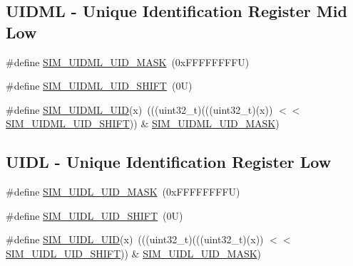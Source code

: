 \subsection*{U\+I\+D\+ML -\/ Unique Identification Register Mid Low}
\begin{DoxyCompactItemize}
\item 
\#define \mbox{\hyperlink{group___s_i_m___register___masks_ga87fba538d2482490ddfdb1ef8a44ec66}{S\+I\+M\+\_\+\+U\+I\+D\+M\+L\+\_\+\+U\+I\+D\+\_\+\+M\+A\+SK}}~(0x\+F\+F\+F\+F\+F\+F\+F\+F\+U)
\item 
\#define \mbox{\hyperlink{group___s_i_m___register___masks_gacedaca5a049852ee395767e70f806c14}{S\+I\+M\+\_\+\+U\+I\+D\+M\+L\+\_\+\+U\+I\+D\+\_\+\+S\+H\+I\+FT}}~(0\+U)
\item 
\#define \mbox{\hyperlink{group___s_i_m___register___masks_ga0eb63e00b9ee42283435043b437b8d29}{S\+I\+M\+\_\+\+U\+I\+D\+M\+L\+\_\+\+U\+ID}}(x)~(((uint32\+\_\+t)(((uint32\+\_\+t)(x)) $<$$<$ \mbox{\hyperlink{group___s_i_m___register___masks_gacedaca5a049852ee395767e70f806c14}{S\+I\+M\+\_\+\+U\+I\+D\+M\+L\+\_\+\+U\+I\+D\+\_\+\+S\+H\+I\+FT}})) \& \mbox{\hyperlink{group___s_i_m___register___masks_ga87fba538d2482490ddfdb1ef8a44ec66}{S\+I\+M\+\_\+\+U\+I\+D\+M\+L\+\_\+\+U\+I\+D\+\_\+\+M\+A\+SK}})
\end{DoxyCompactItemize}
\subsection*{U\+I\+DL -\/ Unique Identification Register Low}
\begin{DoxyCompactItemize}
\item 
\#define \mbox{\hyperlink{group___s_i_m___register___masks_ga412340eabbcd0f0d48ce4886e9beb071}{S\+I\+M\+\_\+\+U\+I\+D\+L\+\_\+\+U\+I\+D\+\_\+\+M\+A\+SK}}~(0x\+F\+F\+F\+F\+F\+F\+F\+F\+U)
\item 
\#define \mbox{\hyperlink{group___s_i_m___register___masks_ga6fb1383717ebfa6f47b5a5952fd21d63}{S\+I\+M\+\_\+\+U\+I\+D\+L\+\_\+\+U\+I\+D\+\_\+\+S\+H\+I\+FT}}~(0\+U)
\item 
\#define \mbox{\hyperlink{group___s_i_m___register___masks_ga636c37811a4a8c9a57df79fd1790b800}{S\+I\+M\+\_\+\+U\+I\+D\+L\+\_\+\+U\+ID}}(x)~(((uint32\+\_\+t)(((uint32\+\_\+t)(x)) $<$$<$ \mbox{\hyperlink{group___s_i_m___register___masks_ga6fb1383717ebfa6f47b5a5952fd21d63}{S\+I\+M\+\_\+\+U\+I\+D\+L\+\_\+\+U\+I\+D\+\_\+\+S\+H\+I\+FT}})) \& \mbox{\hyperlink{group___s_i_m___register___masks_ga412340eabbcd0f0d48ce4886e9beb071}{S\+I\+M\+\_\+\+U\+I\+D\+L\+\_\+\+U\+I\+D\+\_\+\+M\+A\+SK}})
\end{DoxyCompactItemize}


